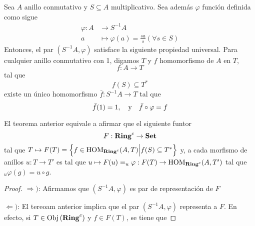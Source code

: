 \documentclass[12pt]{report}
\newcounter{it}
\theoremstyle{largebreak}
\newcommand\cf[3]{\ensuremath{#1:#2\rightarrow#3}}
\newcommand{\Obj}[1]{\ensuremath{\textup{Obj}\left(#1\right)}}
\newcommand{\Cat}[1]{\ensuremath{\textup{\textbf{#1}}}}
\begin{document}
    \begin{theor}
        Sea $A$ anillo conmutativo y $S\subseteq A$ multiplicativo. Sea además $\varphi$ función definida como sigue
        \begin{equation*}
            \begin{split}
                \varphi:A&\rightarrow S^{-1}A\\
                a&\mapsto \varphi(a)=\frac{sa}{s} (\forall s\in S)
            \end{split}
        \end{equation*}
        Entonces, el par $(S^{-1}A,\varphi)$ satisface la siguiente propiedad universal. Para cualquier anillo conmutativo con 1, digamos $T$ y $f$ homomorfismo de $A$ en $T$,
        \begin{equation*}
            \cf{f}{A}{T}
        \end{equation*}
        tal que
        \begin{equation*}
            f(S)\subseteq T^*
        \end{equation*}
        existe un único homomorfismo $\cf{\bar{f}}{S^{-1}A}{T}$ tal que
        \begin{equation*}
            \bar{f}(1)=1,\quad\textup{y}\quad\bar{f}\circ\varphi=f
        \end{equation*}
    \end{theor}

    \begin{exa}
        El teorema anterior equivale a afirmar que el siguiente funtor
        \begin{equation*}
            F:\Cat{Ring}^c\rightarrow\Cat{Set}
        \end{equation*}
        tal que $T\mapsto F(T)=\left\{f\in\HOM{\Cat{Ring}^c}(A,T)\Big|f(S)\subseteq T^* \right\}$ y, a cada morfismo de anillos $\cf{u}{T}{T'}$ es tal que $u\mapsto\cf{F(u)=_u\varphi}{F(T)}{\HOM{\Cat{Ring}^c}(A,T')}$ tal que $_u\varphi(g)=u\circ g$.
    \end{exa}

    \begin{proof}
        $\Rightarrow)$: Afirmamos que $(S^{-1}A,\varphi)$ es par de representación de $F$

        $\Leftarrow)$: El tereoam anterior implica que el par $(S^{-1}A,\varphi)$ representa a $F$.
        En efecto, si $T\in\Obj{\Cat{Ring}^c}$ y $f\in F(T)$, se tiene que
    \end{proof}
\end{document}
